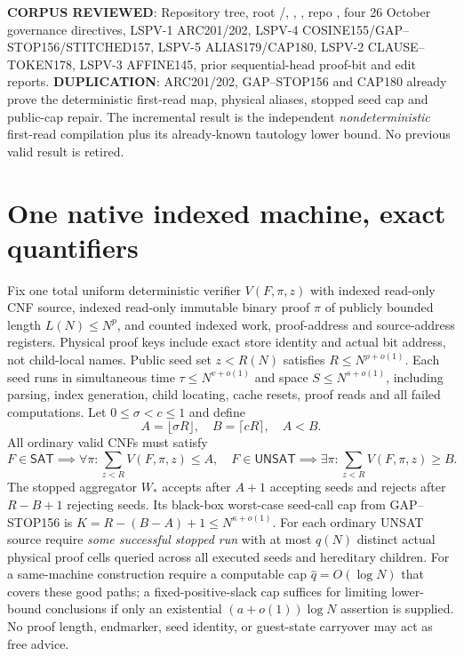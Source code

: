 \documentclass[11pt]{article}
\begin{document}
\textbf{CORPUS REVIEWED}: Repository tree, root /, , , repo , four 26 October governance directives, LSPV-1 ARC201/202, LSPV-4 COSINE155/GAP--STOP156/STITCHED157, LSPV-5 ALIAS179/CAP180, LSPV-2 CLAUSE--TOKEN178, LSPV-3 AFFINE145, prior sequential-head proof-bit and edit reports. \textbf{DUPLICATION}: ARC201/202, GAP--STOP156 and CAP180 already prove the deterministic first-read map, physical aliases, stopped seed cap and public-cap repair. The incremental result is the independent \emph{nondeterministic} first-read compilation plus its already-known tautology lower bound. No previous valid result is retired.

\section{One native indexed machine, exact quantifiers}
Fix one total uniform deterministic verifier $V(F,\pi,z)$ with indexed read-only CNF source, indexed read-only immutable binary proof $\pi$ of publicly bounded length $L(N)\le N^p$, and counted indexed work, proof-address and source-address registers. Physical proof keys include exact store identity and actual bit address, not child-local names. Public seed set $z<R(N)$ satisfies $R\le N^{\rho+o(1)}$. Each seed runs in simultaneous time $\tau\le N^{v+o(1)}$ and space $S\le N^{s+o(1)}$, including parsing, index generation, child locating, cache resets, proof reads and all failed computations. Let $0\le\sigma<c\le1$ and define
\[
 A=\lfloor\sigma R\rfloor,\quad B=\lceil cR\rceil,\quad A<B.
\]
All ordinary valid CNFs must satisfy
\[
F\in\mathsf{SAT}\implies\forall\pi:\sum_{z<R}V(F,\pi,z)\le A,\quad
F\in\mathsf{UNSAT}\implies\exists\pi:\sum_{z<R}V(F,\pi,z)\ge B. \tag{1}
\]
The stopped aggregator $W_*$ accepts after $A+1$ accepting seeds and rejects after $R-B+1$ rejecting seeds. Its black-box worst-case seed-call cap from GAP--STOP156 is $K=R-(B-A)+1\le N^{\kappa+o(1)}$. For each ordinary UNSAT source require \emph{some successful stopped run} with at most $q(N)$ distinct actual physical proof cells queried across all executed seeds and hereditary children. For a same-machine construction require a computable cap $\widehat q=O(\log N)$ that covers these good paths; a fixed-positive-slack cap suffices for limiting lower-bound conclusions if only an existential $(a+o(1))\log N$ assertion is supplied. No proof length, endmarker, seed identity, or guest-state carryover may act as free advice.
\end{document}
